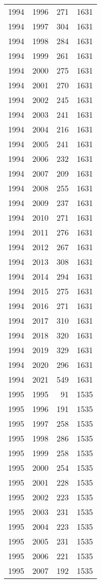 \documentclass[
  11pt,
  letterpaper,
  DIV=11,
  numbers=noendperiod,
  twoside]{scrartcl}
\begin{document}
\begin{longtable}[]{@{}rrrr@{}}
1994 & 1996 & 271 & 1631 \\
1994 & 1997 & 304 & 1631 \\
1994 & 1998 & 284 & 1631 \\
1994 & 1999 & 261 & 1631 \\
1994 & 2000 & 275 & 1631 \\
1994 & 2001 & 270 & 1631 \\
1994 & 2002 & 245 & 1631 \\
1994 & 2003 & 241 & 1631 \\
1994 & 2004 & 216 & 1631 \\
1994 & 2005 & 241 & 1631 \\
1994 & 2006 & 232 & 1631 \\
1994 & 2007 & 209 & 1631 \\
1994 & 2008 & 255 & 1631 \\
1994 & 2009 & 237 & 1631 \\
1994 & 2010 & 271 & 1631 \\
1994 & 2011 & 276 & 1631 \\
1994 & 2012 & 267 & 1631 \\
1994 & 2013 & 308 & 1631 \\
1994 & 2014 & 294 & 1631 \\
1994 & 2015 & 275 & 1631 \\
1994 & 2016 & 271 & 1631 \\
1994 & 2017 & 310 & 1631 \\
1994 & 2018 & 320 & 1631 \\
1994 & 2019 & 329 & 1631 \\
1994 & 2020 & 296 & 1631 \\
1994 & 2021 & 549 & 1631 \\
1995 & 1995 & 91 & 1535 \\
1995 & 1996 & 191 & 1535 \\
1995 & 1997 & 258 & 1535 \\
1995 & 1998 & 286 & 1535 \\
1995 & 1999 & 258 & 1535 \\
1995 & 2000 & 254 & 1535 \\
1995 & 2001 & 228 & 1535 \\
1995 & 2002 & 223 & 1535 \\
1995 & 2003 & 231 & 1535 \\
1995 & 2004 & 223 & 1535 \\
1995 & 2005 & 231 & 1535 \\
1995 & 2006 & 221 & 1535 \\
1995 & 2007 & 192 & 1535 \\

\end{longtable}
\end{document}
